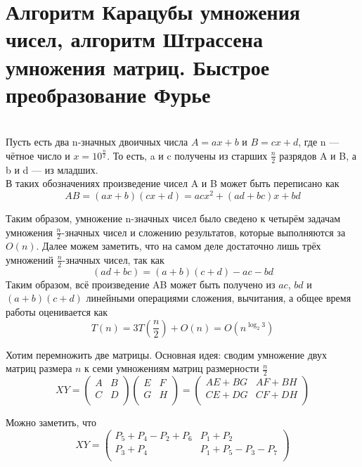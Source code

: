 \section {Алгоритм Карацубы умножения чисел, алгоритм Штрассена умножения матриц. Быстрое преобразование Фурье}

 \\
Пусть есть два n-значных двоичных числа $A = a x + b$ и $B=c x + d$, где n — чётное число и $x=10^{\frac n 2}$. То есть, a и c получены из старших $\frac n 2$ разрядов A и B, а b и d — из младших. \\
\noindent В таких обозначениях произведение чисел A и B может быть переписано как
$$
AB = (a x + b)(c x + d) = a c x^2 + (a d + b c) x + b d
$$

\noindent Таким образом, умножение n-значных чисел было сведено к четырём задачам умножения $\frac n 2$-значных чисел и сложению результатов, которые выполняются за $O(n)$.
Далее можем заметить, что на самом деле достаточно лишь трёх умножений $\frac n 2$-значных чисел, так как
$$
(a d + b c) = (a + b)(c + d) - a c - b d
$$
Таким образом, всё произведение AB может быть получено из $a c$, $b d$ и $(a + b)(c + d)$ линейными операциями сложения, вычитания, а общее время работы оценивается как
$$
T(n) = 3 T (\frac {n}{2}) + O(n) =  O(n^{\log _{2}3})
$$


\noindent Хотим перемножить две матрицы. Основная идея: сводим умножение двух матриц размера $n$ к семи умножениям матриц размерности $\frac n 2$
\begin{equation*}
XY = \left(
\begin{array}{cc}
A & B \\
C & D\\
\end{array}
\right)
\left(
\begin{array}{cc}
E & F \\
G & H \\
\end{array}
\right)
=
\left(
\begin{array}{cc}
AE + BG & AF + BH \\
CE + DG & CF + DH \\
\end{array}
\right)
\end{equation*}

\noindent Можно заметить, что 
\begin{equation*}
XY = \left(
\begin{array}{cc}
P_5 + P_4 - P_2 + P_6 & P_1 + P_2 \\
P_3 + P_4 & P_1+ P_5 - P_3 - P_7\\
\end{array}
\right)
\end{equation*}

